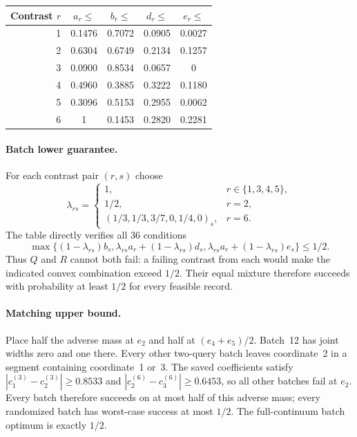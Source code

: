 \documentclass[12pt]{article}
\begin{document}
\begin{center}
\setlength{\tabcolsep}{8pt}
\begin{tabular}{rcccc}
\toprule
Contrast $r$&$a_r\leq$&$b_r\leq$&$d_r\leq$&$e_r\leq$\\
\midrule
1&0.1476&0.7072&0.0905&0.0027\\
2&0.6304&0.6749&0.2134&0.1257\\
3&0.0900&0.8534&0.0657&0\\
4&0.4960&0.3885&0.3222&0.1180\\
5&0.3096&0.5153&0.2955&0.0062\\
6&1&0.1453&0.2820&0.2281\\
\bottomrule
\end{tabular}
\end{center}
\paragraph{Batch lower guarantee.}
For each contrast pair $(r,s)$ choose
\[
 \lambda_{rs}=\begin{cases}
 1,&r\in\{1,3,4,5\},\\
 1/2,&r=2,\\
 (1/3,1/3,3/7,0,1/4,0)_s,&r=6.
 \end{cases}
\]
The table directly verifies all 36 conditions
\[
 \max\{(1-\lambda_{rs})b_s,
 \lambda_{rs}a_r+(1-\lambda_{rs})d_s,
 \lambda_{rs}a_r+(1-\lambda_{rs})e_s\}\leq1/2.
\]
Thus $Q$ and $R$ cannot both fail: a failing contrast from each would make
the indicated convex combination exceed $1/2$.  Their equal mixture
therefore succeeds with probability at least $1/2$ for every feasible record.

\paragraph{Matching upper bound.}
Place half the adverse mass at $e_2$ and half at $(e_4+e_5)/2$.
Batch~12 has joint widths zero and one there.  Every other two-query
batch leaves coordinate~2 in a segment containing coordinate~1 or~3.
The saved coefficients satisfy
$|c^{(3)}_1-c^{(3)}_2|\geq0.8533$ and
$|c^{(6)}_2-c^{(6)}_3|\geq0.6453$, so all other batches fail at $e_2$.
Every batch therefore succeeds on at most half of this adverse mass;
every randomized batch has worst-case success at most $1/2$.
The full-continuum batch optimum is exactly $1/2$.
\end{document}
